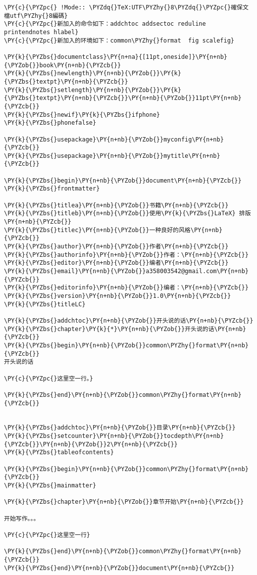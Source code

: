\begin{Verbatim}[commandchars=\\\{\}]
\PY{c}{\PYZpc{} !Mode:: \PYZdq{}TeX:UTF\PYZhy{}8\PYZdq{}\PYZpc{}確保文檔utf\PYZhy{}8編碼}
\PY{c}{\PYZpc{}新加入的命令如下：addchtoc addsectoc reduline printendnotes hlabel}
\PY{c}{\PYZpc{}新加入的环境如下：common\PYZhy{}format  fig scalefig}

\PY{k}{\PYZbs{}documentclass}\PY{n+na}{[11pt,oneside]}\PY{n+nb}{\PYZob{}}book\PY{n+nb}{\PYZcb{}}
\PY{k}{\PYZbs{}newlength}\PY{n+nb}{\PYZob{}}\PY{k}{\PYZbs{}textpt}\PY{n+nb}{\PYZcb{}}
\PY{k}{\PYZbs{}setlength}\PY{n+nb}{\PYZob{}}\PY{k}{\PYZbs{}textpt}\PY{n+nb}{\PYZcb{}}\PY{n+nb}{\PYZob{}}11pt\PY{n+nb}{\PYZcb{}}
\PY{k}{\PYZbs{}newif}\PY{k}{\PYZbs{}ifphone}
\PY{k}{\PYZbs{}phonefalse}

\PY{k}{\PYZbs{}usepackage}\PY{n+nb}{\PYZob{}}myconfig\PY{n+nb}{\PYZcb{}}
\PY{k}{\PYZbs{}usepackage}\PY{n+nb}{\PYZob{}}mytitle\PY{n+nb}{\PYZcb{}}

\PY{k}{\PYZbs{}begin}\PY{n+nb}{\PYZob{}}document\PY{n+nb}{\PYZcb{}}
\PY{k}{\PYZbs{}frontmatter}

\PY{k}{\PYZbs{}titlea}\PY{n+nb}{\PYZob{}}书籍\PY{n+nb}{\PYZcb{}}
\PY{k}{\PYZbs{}titleb}\PY{n+nb}{\PYZob{}}使用\PY{k}{\PYZbs{}LaTeX} 排版\PY{n+nb}{\PYZcb{}}
\PY{k}{\PYZbs{}titlec}\PY{n+nb}{\PYZob{}}一种良好的风格\PY{n+nb}{\PYZcb{}}
\PY{k}{\PYZbs{}author}\PY{n+nb}{\PYZob{}}作者\PY{n+nb}{\PYZcb{}}
\PY{k}{\PYZbs{}authorinfo}\PY{n+nb}{\PYZob{}}作者：\PY{n+nb}{\PYZcb{}}
\PY{k}{\PYZbs{}editor}\PY{n+nb}{\PYZob{}}编者\PY{n+nb}{\PYZcb{}}
\PY{k}{\PYZbs{}email}\PY{n+nb}{\PYZob{}}a358003542@gmail.com\PY{n+nb}{\PYZcb{}}
\PY{k}{\PYZbs{}editorinfo}\PY{n+nb}{\PYZob{}}编者：\PY{n+nb}{\PYZcb{}}
\PY{k}{\PYZbs{}version}\PY{n+nb}{\PYZob{}}1.0\PY{n+nb}{\PYZcb{}}
\PY{k}{\PYZbs{}titleLC}

\PY{k}{\PYZbs{}addchtoc}\PY{n+nb}{\PYZob{}}开头说的话\PY{n+nb}{\PYZcb{}}
\PY{k}{\PYZbs{}chapter}\PY{k}{*}\PY{n+nb}{\PYZob{}}开头说的话\PY{n+nb}{\PYZcb{}}
\PY{k}{\PYZbs{}begin}\PY{n+nb}{\PYZob{}}common\PYZhy{}format\PY{n+nb}{\PYZcb{}}
开头说的话

\PY{c}{\PYZpc{}这里空一行。}

\PY{k}{\PYZbs{}end}\PY{n+nb}{\PYZob{}}common\PYZhy{}format\PY{n+nb}{\PYZcb{}}


\PY{k}{\PYZbs{}addchtoc}\PY{n+nb}{\PYZob{}}目录\PY{n+nb}{\PYZcb{}}
\PY{k}{\PYZbs{}setcounter}\PY{n+nb}{\PYZob{}}tocdepth\PY{n+nb}{\PYZcb{}}\PY{n+nb}{\PYZob{}}2\PY{n+nb}{\PYZcb{}}
\PY{k}{\PYZbs{}tableofcontents}

\PY{k}{\PYZbs{}begin}\PY{n+nb}{\PYZob{}}common\PYZhy{}format\PY{n+nb}{\PYZcb{}}
\PY{k}{\PYZbs{}mainmatter}

\PY{k}{\PYZbs{}chapter}\PY{n+nb}{\PYZob{}}章节开始\PY{n+nb}{\PYZcb{}}

开始写作。。。

\PY{c}{\PYZpc{}这里空一行}

\PY{k}{\PYZbs{}end}\PY{n+nb}{\PYZob{}}common\PYZhy{}format\PY{n+nb}{\PYZcb{}}
\PY{k}{\PYZbs{}end}\PY{n+nb}{\PYZob{}}document\PY{n+nb}{\PYZcb{}}
\end{Verbatim}
